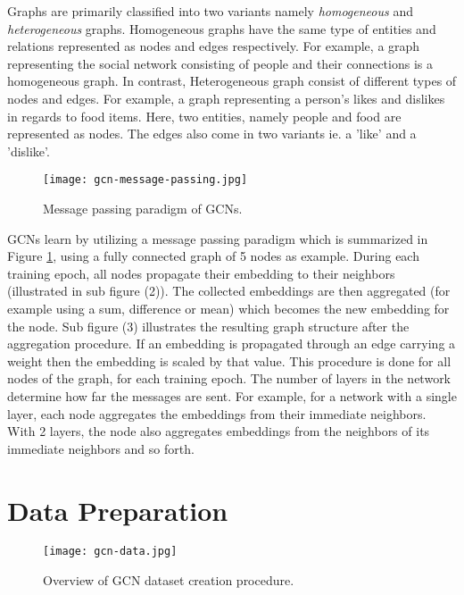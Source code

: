 Graphs are primarily classified into two variants namely
\emph{homogeneous} and \emph{heterogeneous} graphs. Homogeneous graphs
have the same type of entities and relations represented as nodes and
edges respectively. For example, a graph representing the social
network consisting of people and their connections is a homogeneous
graph. In contrast, Heterogeneous graph consist of different types of
nodes and edges. For example, a graph representing a person's likes
and dislikes in regards to food items. Here, two entities, namely
people and food are represented as nodes. The edges also come in two
variants ie. a 'like' and a 'dislike'.

\begin{figure}[htb]
  \centering
  \texttt{[image: gcn-message-passing.jpg]}
  \caption{Message passing paradigm of GCNs.}
  \label{fig:gcn-message-passing}
\end{figure}
  
GCNs learn by utilizing a message passing paradigm which is summarized
in Figure \ref{fig:gcn-message-passing}, using a fully connected graph
of 5 nodes as example. During each training epoch, all nodes propagate
their embedding to their neighbors (illustrated in sub figure (2)).
The collected embeddings are then aggregated (for example using a sum,
difference or mean) which becomes the new embedding for the node. Sub
figure (3) illustrates the resulting graph structure after the
aggregation procedure. If an embedding is propagated through an edge
carrying a weight then the embedding is scaled by that value. This
procedure is done for all nodes of the graph, for each training epoch.
The number of layers in the network determine how far the messages are
sent. For example, for a network with a single layer, each node
aggregates the embeddings from their immediate neighbors. With 2
layers, the node also aggregates embeddings from the neighbors of its
immediate neighbors and so forth.

\section{Data Preparation}
\label{sec:gcn-data-prep}

\begin{figure}[htb]
  \centering
  \texttt{[image: gcn-data.jpg]}
  \caption{Overview of GCN dataset creation procedure.}
  \label{fig:gcn-data}
\end{figure}

